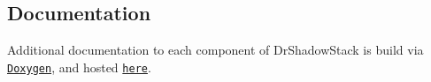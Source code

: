 \subsection*{Documentation}

Additional documentation to each component of Dr\+Shadow\+Stack is build via \href{http://www.stack.nl/~dimitri/doxygen/}{\tt Doxygen}, and hosted \href{https://zwimer.com/DrShadowStack}{\tt here}. 